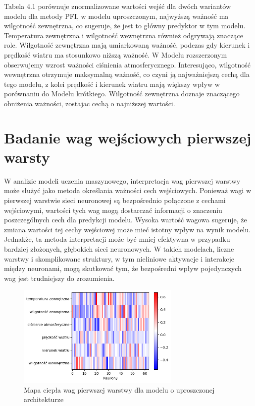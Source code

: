 \documentclass[a4paper,twoside,12pt]{book}
\begin{document}
Tabela 4.1 porównuje znormalizowane wartości wejść dla dwóch wariantów modelu dla metody PFI, w modelu uproszczonym, najwyższą ważność ma wilgotność zewnętrzna, co sugeruje, że jest to główny predyktor w tym modelu. Temperatura zewnętrzna i wilgotność wewnętrzna również odgrywają znaczące role. Wilgotność zewnętrzna mają umiarkowaną ważność, podczas gdy kierunek i prędkość wiatru ma stosunkowo niższą ważność. W Modelu rozszerzonym obserwujemy wzrost ważności ciśnienia atmosferycznego. Interesująco, wilgotność wewnętrzna otrzymuje maksymalną ważność, co czyni ją najważniejszą cechą dla tego modelu, z kolei prędkość i kierunek wiatru mają większy wpływ w porównaniu do Modelu krótkiego. Wilgotność zewnętrzna doznaje znaczącego obniżenia ważności, zostajac cechą o najniższej wartości.
\newpage
\section{Badanie wag wejściowych pierwszej warsty}
W analizie modeli uczenia maszynowego, interpretacja wag pierwszej warstwy może służyć jako metoda określania ważności cech wejściowych. Ponieważ wagi w pierwszej warstwie sieci neuronowej są bezpośrednio połączone z cechami wejściowymi, wartości tych wag mogą dostarczać informacji o znaczeniu poszczególnych cech dla predykcji modelu. Wysoka wartość wagowa sugeruje, że zmiana wartości tej cechy wejściowej może mieć istotny wpływ na wynik modelu. Jednakże, ta metoda interpretacji może być mniej efektywna w przypadku bardziej złożonych, głębokich sieci neuronowych. W takich modelach, liczne warstwy i skomplikowane struktury, w tym nieliniowe aktywacje i interakcje między neuronami, mogą skutkować tym, że bezpośredni wpływ pojedynczych wag jest trudniejszy do zrozumienia.
\begin{figure}[!h]
  \centering
  \includegraphics[width=0.7\textwidth]{img/heatmap1.png}
  \caption{Mapa ciepła wag pierwszej warstwy dla modelu o uproszczonej architekturze}
  \label{fig:etykieta-rysunku}
\end{figure}
\end{document}
